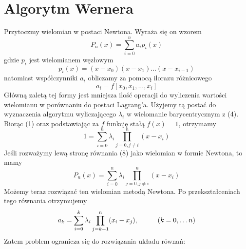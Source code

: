 \documentclass[11pt, wide]{article}
\begin{document}
\section{Algorytm Wernera}\label{werner}
Przytoczmy wielomian w postaci Newtona. Wyraża się on wzorem
\begin{equation}
    P_n(x) = \sum_{i=0}^{n}a_i p_i(x)
\end{equation}
gdzie $p_i$ jest wielomianem węzłowym
\begin{equation*}
    p_i(x) = (x - x_0)(x - x_1)\ldots(x - x_{i-1})
\end{equation*}
natomiast współczynniki $a_i$ obliczamy za pomocą ilorazu różnicowego
\begin{equation*}
    a_i = f[x_0,x_1,\ldots,x_i]
\end{equation*}
Główną zaletą tej formy jest mniejsza ilość operacji do wyliczenia wartości
wielomianu w porównaniu do postaci Lagrang'a. Użyjemy tą postać do wyznaczenia algorytmu
wyliczającego $\lambda_i$ w wielomanie barycentrycznym z (4).
\\
Biorąc (1) oraz podstawiając za $f$ funkcję stałą $f(x) = 1$, otrzymamy
\begin{equation}
    1 = \sum_{i = 0}^n\lambda_i\prod_{j=0,j\neq i}^{n}(x - x_i)
\end{equation}
Jeśli rozważymy lewą stronę równania (8) jako wielomian w formie Newtona, to mamy
\begin{equation*}
    P_n(x) = \sum_{i = 0}^n\lambda_i\prod_{j=0,j\neq i}^{n}(x - x_i)
\end{equation*}
Możemy teraz rozwiązać ten wielomian metodą Newtona.
Po przekształceniach tego równania otrzymujemy
\begin{equation*}
    a_k = \sum_{i=0}^{k}\lambda_i\prod_{j=k+1}^{n}(x_i - x_j),\hspace*{1cm} (k = 0, \ldots n)
\end{equation*}
Zatem problem ogranicza się do rozwiązania układu równań:
\end{document}
